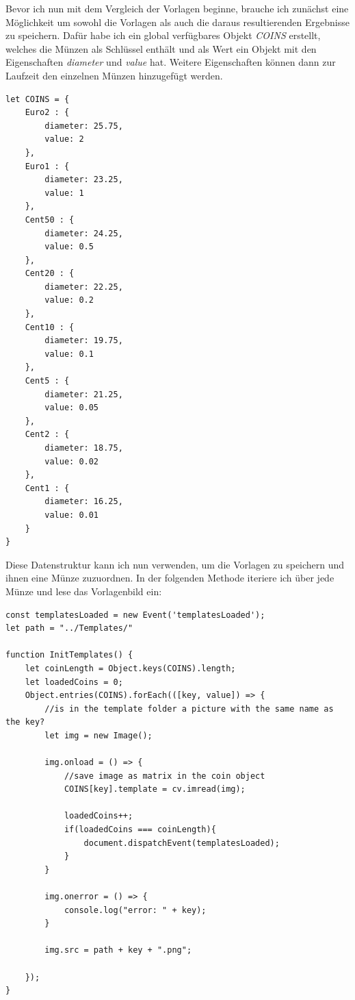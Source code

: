 Bevor ich nun mit dem Vergleich der Vorlagen beginne, brauche ich zunächst eine Möglichkeit um sowohl die Vorlagen als auch die daraus resultierenden Ergebnisse zu speichern. Dafür habe ich ein global verfügbares Objekt \textit{COINS} erstellt, welches die Münzen als Schlüssel enthält und als Wert ein Objekt mit den Eigenschaften \textit{diameter} und \textit{value} hat. Weitere Eigenschaften können dann zur Laufzeit den einzelnen Münzen hinzugefügt werden.

\begin{lstlisting}[style=JavaScript]
let COINS = {
    Euro2 : {
        diameter: 25.75,
        value: 2
    },
    Euro1 : {
        diameter: 23.25,
        value: 1
    },
    Cent50 : {
        diameter: 24.25,
        value: 0.5
    },
    Cent20 : {
        diameter: 22.25,
        value: 0.2
    },
    Cent10 : {
        diameter: 19.75,
        value: 0.1
    },
    Cent5 : {
        diameter: 21.25,
        value: 0.05
    },
    Cent2 : {
        diameter: 18.75,
        value: 0.02
    },
    Cent1 : {
        diameter: 16.25,
        value: 0.01
    }
}    
\end{lstlisting}

Diese Datenstruktur kann ich nun verwenden, um die Vorlagen zu speichern und ihnen eine Münze zuzuordnen. In der folgenden Methode iteriere ich über jede Münze und lese das Vorlagenbild ein:

\begin{lstlisting}[style=JavaScript]
const templatesLoaded = new Event('templatesLoaded');
let path = "../Templates/"

function InitTemplates() {
    let coinLength = Object.keys(COINS).length;
    let loadedCoins = 0;
    Object.entries(COINS).forEach(([key, value]) => {
        //is in the template folder a picture with the same name as the key?
        let img = new Image();

        img.onload = () => {
            //save image as matrix in the coin object
            COINS[key].template = cv.imread(img);

            loadedCoins++;
            if(loadedCoins === coinLength){
                document.dispatchEvent(templatesLoaded);
            }
        }

        img.onerror = () => {
            console.log("error: " + key);
        }

        img.src = path + key + ".png";

    });
}
\end{lstlisting}

